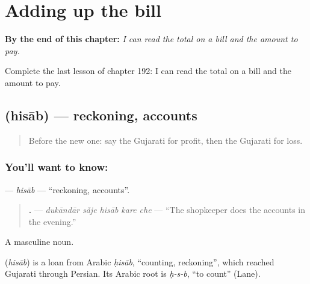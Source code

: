 
\chapter{Adding up the bill}
\label{ch:gu-adding-up-the-bill}

\begin{chapteropening}
\textbf{By the end of this chapter:} \emph{I can read the total on a bill and the amount to pay.}

Complete the last lesson of chapter 192: I can read the total on a bill and the amount to pay.
\end{chapteropening}

\section[\texorpdfstring{\gu{હિસાબ} (hisāb)}{હિસાબ (hisāb)}]{ (hisāb) — reckoning, accounts}

\label{lesson:GU-C192-hisab}



\begin{quote}
Before the new one: say the Gujarati for profit, then the Gujarati for loss.
\end{quote}

\subsection*{You'll want to know: }
\textbf{} — \emph{hisāb} — \textquotedblleft{}reckoning, accounts\textquotedblright{}.

\begin{quote}
\textbf{    .} — \emph{dukāndār sā̃je hisāb kare che} — \textquotedblleft{}The shopkeeper does the accounts in the evening.\textquotedblright{}
\end{quote}

A masculine noun.

\begin{cousinweb}
\textbf{} (\emph{hisāb}) is a loan from Arabic \emph{ḥisāb}, \textquotedblleft{}counting, reckoning\textquotedblright{}, which reached Gujarati through Persian. Its Arabic root is \emph{ḥ-s-b}, \textquotedblleft{}to count\textquotedblright{} (Lane).
\end{cousinweb}


